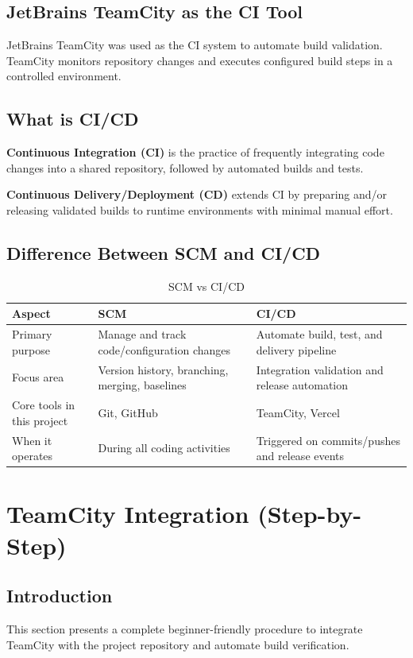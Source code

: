 \documentclass[12pt,a4paper]{report}
\begin{document}
\section{JetBrains TeamCity as the CI Tool}
JetBrains TeamCity was used as the CI system to automate build validation. TeamCity monitors repository changes and executes configured build steps in a controlled environment.

\section{What is CI/CD}
\textbf{Continuous Integration (CI)} is the practice of frequently integrating code changes into a shared repository, followed by automated builds and tests.

\textbf{Continuous Delivery/Deployment (CD)} extends CI by preparing and/or releasing validated builds to runtime environments with minimal manual effort.

\section{Difference Between SCM and CI/CD}
\begin{table}[H]
\centering
\caption{SCM vs CI/CD}
\begin{tabular}{p{} p{} p{}}
\toprule
\textbf{Aspect} & \textbf{SCM} & \textbf{CI/CD} \\
\midrule
Primary purpose & Manage and track code/configuration changes & Automate build, test, and delivery pipeline \\
Focus area & Version history, branching, merging, baselines & Integration validation and release automation \\
Core tools in this project & Git, GitHub & TeamCity, Vercel \\
When it operates & During all coding activities & Triggered on commits/pushes and release events \\
\bottomrule
\end{tabular}
\end{table}

\chapter{TeamCity Integration (Step-by-Step)}
\section{Introduction}
This section presents a complete beginner-friendly procedure to integrate TeamCity with the project repository and automate build verification.
\end{document}
